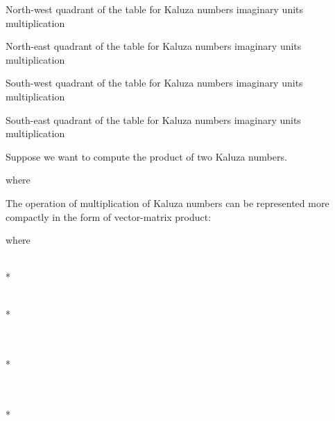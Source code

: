 \documentclass{jtacs}
\numberwithin{equation}{section}
\begin{document}
\begin{table}[h]
\caption{North-west quadrant of the table for Kaluza numbers imaginary units multiplication}
\begin{adjustbox}{width=0.99\textwidth, margin = 0 0 0 10}

\end{adjustbox}
\label{tab1}
\end{table}\begin{table}[h]
\caption{North-east quadrant of the table for Kaluza numbers imaginary units multiplication}
\begin{adjustbox}{width=0.99\textwidth}

\end{adjustbox}
\label{tab2}
\end{table}
\begin{table}[h]
\caption{South-west quadrant of the table for Kaluza numbers imaginary units multiplication}
\begin{adjustbox}{width=0.99\textwidth}

\end{adjustbox}
\label{tab3}
\end{table}
\begin{table}[h]\caption{South-east quadrant of the table for Kaluza numbers imaginary units multiplication }
\begin{adjustbox}{width=0.99\textwidth}

\end{adjustbox}
\label{tab4}
\end{table}
\FloatBarrier
Suppose we want to compute the product of two Kaluza numbers.


where



The operation of multiplication of Kaluza numbers can be represented more compactly in
the form of vector-matrix product:

where





\\*
\begin{adjustbox}{width=\textwidth, margin= 3 15 0 5}

\end{adjustbox}
\\*
\begin{adjustbox}{width=\textwidth, margin= 3 15 0 5}

\end{adjustbox}
\\
\\*
\begin{adjustbox}{width=\textwidth, margin= 3 15 0 5}

\end{adjustbox}
\\
\\*
\begin{adjustbox}{width=\textwidth, margin= 3 15 0 5}

\end{adjustbox}
\end{document}
